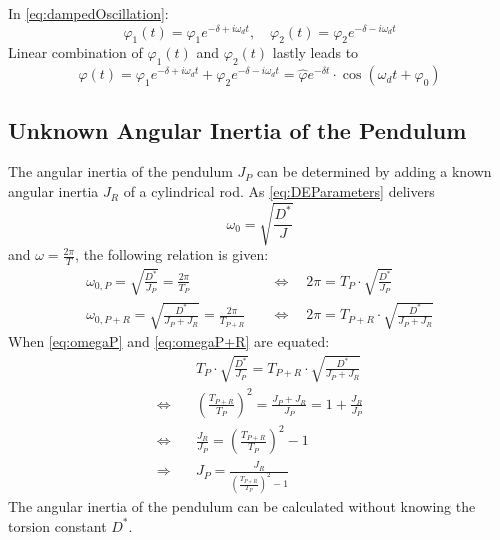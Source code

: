             In \cref{eq:dampedOscillation}:
            \begin{equation}
                \varphi_1(t) = \varphi_1 e^{-\delta + i\omega_d t}, \quad \varphi_2(t) = \varphi_2 e^{-\delta - i\omega_d t}
            \end{equation}
            Linear combination of \( \varphi_1(t) \) and \( \varphi_2(t) \) lastly leads to
            \begin{equation}
                \varphi(t) = \varphi_1 e^{-\delta + i\omega_d t} + \varphi_2 e^{-\delta - i\omega_d t} = \hat{\varphi}e^{-\delta t} \cdot \cos{\left( \omega_d t + \varphi_0 \right)}
            \end{equation}
    \subsection*{Unknown Angular Inertia of the Pendulum}\label{sec:preparation_task_3}
        The angular inertia of the pendulum \( J_P \) can be determined by adding a known angular inertia \( J_R \) of a cylindrical rod. As \cref{eq:DEParameters} delivers
        \begin{equation}
            \omega_0=\sqrt{\frac{D^*}{J}}
        \end{equation}
        and \( \omega=\frac{2\pi}{T} \), the following relation is given:
        \begin{align}
            \omega_{0,P}=\sqrt{\frac{D^*}{J_P}}=\frac{2\pi}{T_P} \quad              &\Leftrightarrow \quad 2\pi=T_P\cdot\sqrt{\frac{D^*}{J_P}} \label{eq:omegaP} \\
            \omega_{0,P+R}=\sqrt{\frac{D^*}{J_P+J_R}}=\frac{2\pi}{T_{P+R}} \quad    &\Leftrightarrow \quad 2\pi=T_{P+R}\cdot\sqrt{\frac{D^*}{J_P+J_R}} \label{eq:omegaP+R}
        \end{align}
        When \cref{eq:omegaP} and \cref{eq:omegaP+R} are equated:
        \begin{align}
                                    &T_P\cdot\sqrt{\frac{D^*}{J_P}}=T_{P+R}\cdot\sqrt{\frac{D^*}{J_P+J_R}} \nonumber\\
            \Leftrightarrow \quad   &\left( \frac{T_{P+R}}{T_P} \right)^2 =\frac{J_P+J_R}{J_P}=1+\frac{J_R}{J_P} \nonumber\\
            \Leftrightarrow \quad   &\frac{J_R}{J_P}=\left( \frac{T_{P+R}}{T_P} \right)^2-1 \nonumber\\
            \Rightarrow \quad       &J_P=\frac{J_R}{\left( \frac{T_{P+R}}{T_P} \right)^2-1}
        \end{align}
        The angular inertia of the pendulum can be calculated without knowing the torsion constant \( D^* \).
